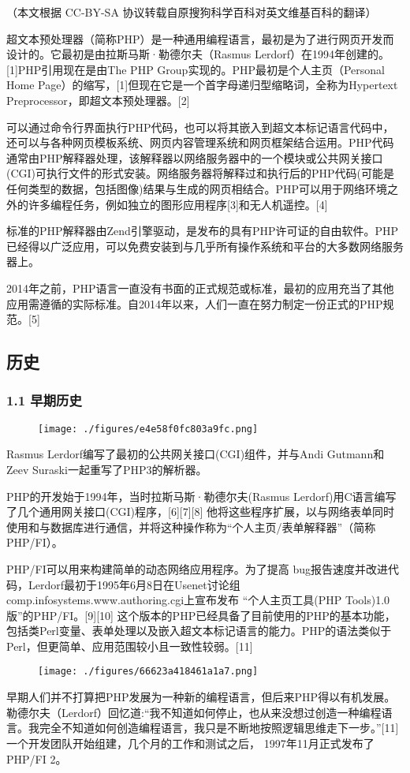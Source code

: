 
（本文根据 CC-BY-SA 协议转载自原搜狗科学百科对英文维基百科的翻译）

超文本预处理器（简称PHP）是一种通用编程语言，最初是为了进行网页开发而设计的。它最初是由拉斯马斯·勒德尔夫（Rasmus Lerdorf）在1994年创建的。[1]PHP引用现在是由The PHP Group实现的。PHP最初是个人主页（Personal Home Page）的缩写，[1]但现在它是一个首字母递归型缩略词，全称为Hypertext Preprocessor，即超文本预处理器。[2]

可以通过命令行界面执行PHP代码，也可以将其嵌入到超文本标记语言代码中，还可以与各种网页模板系统、网页内容管理系统和网页框架结合运用。PHP代码通常由PHP解释器处理，该解释器以网络服务器中的一个模块或公共网关接口(CGI)可执行文件的形式安装。网络服务器将解释过和执行后的PHP代码(可能是任何类型的数据，包括图像)结果与生成的网页相结合。PHP可以用于网络环境之外的许多编程任务，例如独立的图形应用程序[3]和无人机遥控。[4]

标准的PHP解释器由Zend引擎驱动，是发布的具有PHP许可证的自由软件。PHP已经得以广泛应用，可以免费安装到与几乎所有操作系统和平台的大多数网络服务器上。

2014年之前，PHP语言一直没有书面的正式规范或标准，最初的应用充当了其他应用需遵循的实际标准。自2014年以来，人们一直在努力制定一份正式的PHP规范。[5]

\subsection{历史}
\subsubsection{1.1 早期历史}
\begin{figure}[ht]
\centering
\texttt{[image: ./figures/e4e58f0fc803a9fc.png]}
\caption\label{fig_PHP_1}
\end{figure}
Rasmus Lerdorf编写了最初的公共网关接口(CGI)组件，并与Andi Gutmann和Zeev Suraski一起重写了PHP3的解析器。

PHP的开发始于1994年，当时拉斯马斯·勒德尔夫(Rasmus Lerdorf)用C语言编写了几个通用网关接口(CGI)程序，[6][7][8] 他将这些程序扩展，以与网络表单同时使用和与数据库进行通信，并将这种操作称为“个人主页/表单解释器”（简称 PHP/FI）。

PHP/FI可以用来构建简单的动态网络应用程序。为了提高 bug报告速度并改进代码，Lerdorf最初于1995年6月8日在Usenet讨论组comp.infosystems.www.authoring.cgi上宣布发布 “个人主页工具(PHP Tools)1.0版”的PHP/FI。[9][10] 这个版本的PHP已经具备了目前使用的PHP的基本功能，包括类Perl变量、表单处理以及嵌入超文本标记语言的能力。PHP的语法类似于Perl，但更简单、应用范围较小且一致性较弱。[11]
\begin{figure}[ht]
\centering
\texttt{[image: ./figures/66623a418461a1a7.png]}
\caption\label{fig_PHP_2}
\end{figure}
早期人们并不打算把PHP发展为一种新的编程语言，但后来PHP得以有机发展。勒德尔夫（Lerdorf）回忆道:“我不知道如何停止，也从来没想过创造一种编程语言。我完全不知道如何创造编程语言，我只是不断地按照逻辑思维走下一步。”[11] 一个开发团队开始组建，几个月的工作和测试之后， 1997年11月正式发布了PHP/FI 2。

